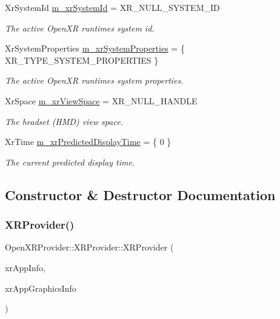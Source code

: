 \begin{DoxyCompactItemize}
Xr\+System\+Id \mbox{\hyperlink{class_open_x_r_provider_1_1_x_r_provider_ac737e2e5b04bd924012ea0c40636c136}{m\+\_\+xr\+System\+Id}} = X\+R\+\_\+\+N\+U\+L\+L\+\_\+\+S\+Y\+S\+T\+E\+M\+\_\+\+ID
\begin{DoxyCompactList}\small\item\em The active Open\+XR runtime\textquotesingle{}s system id. \end{DoxyCompactList}\item 
Xr\+System\+Properties \mbox{\hyperlink{class_open_x_r_provider_1_1_x_r_provider_a88b5c958163af32297db09ffc49ae23b}{m\+\_\+xr\+System\+Properties}} = \{ X\+R\+\_\+\+T\+Y\+P\+E\+\_\+\+S\+Y\+S\+T\+E\+M\+\_\+\+P\+R\+O\+P\+E\+R\+T\+I\+ES \}
\begin{DoxyCompactList}\small\item\em The active Open\+XR runtime\textquotesingle{}s system properties. \end{DoxyCompactList}\item 
Xr\+Space \mbox{\hyperlink{class_open_x_r_provider_1_1_x_r_provider_a5c3ba17df358b63e82c13ae09700f943}{m\+\_\+xr\+View\+Space}} = X\+R\+\_\+\+N\+U\+L\+L\+\_\+\+H\+A\+N\+D\+LE
\begin{DoxyCompactList}\small\item\em The headset (H\+MD) view space. \end{DoxyCompactList}\item 
Xr\+Time \mbox{\hyperlink{class_open_x_r_provider_1_1_x_r_provider_a5606d0dca9ff04f8936eeb77d9a8cea2}{m\+\_\+xr\+Predicted\+Display\+Time}} = \{ 0 \}
\begin{DoxyCompactList}\small\item\em The current predicted display time. \end{DoxyCompactList}\end{DoxyCompactItemize}


\subsection{Constructor \& Destructor Documentation}
\mbox{\label{class_open_x_r_provider_1_1_x_r_provider_ae4e2c14022b9db81c0c4090151976bcf}} 
\subsubsection{\texorpdfstring{XRProvider()}{XRProvider()}}
{\footnotesize\ttfamily Open\+X\+R\+Provider\+::\+X\+R\+Provider\+::\+X\+R\+Provider (\begin{DoxyParamCaption}\item[{\mbox{\hyperlink{struct_open_x_r_provider_1_1_x_r_app_info}{X\+R\+App\+Info}}}]{xr\+App\+Info,  }\item[{\mbox{\hyperlink{struct_open_x_r_provider_1_1_x_r_app_graphics_info}{X\+R\+App\+Graphics\+Info}}}]{xr\+App\+Graphics\+Info }\end{DoxyParamCaption})}

